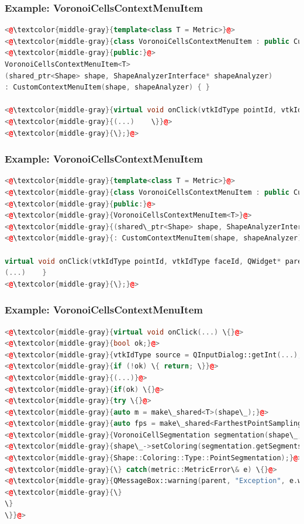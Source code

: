 \documentclass[compress]{beamer}
\begin{document}
\begin{frame}[fragile]
\frametitle{Example: VoronoiCellsContextMenuItem}

\begin{lstlisting}[language=C++, numbers=none]
<@\textcolor{middle-gray}{template<class T = Metric>}@>
<@\textcolor{middle-gray}{class VoronoiCellsContextMenuItem : public CustomContextMenuItem \{}@>
<@\textcolor{middle-gray}{public:}@>
VoronoiCellsContextMenuItem<T>
(shared_ptr<Shape> shape, ShapeAnalyzerInterface* shapeAnalyzer)
: CustomContextMenuItem(shape, shapeAnalyzer) { }

<@\textcolor{middle-gray}{virtual void onClick(vtkIdType pointId, vtkIdType faceId, QWidget* parent) \{}@>
<@\textcolor{middle-gray}{(...)    \}}@>
<@\textcolor{middle-gray}{\};}@>
\end{lstlisting}

\end{frame}

\begin{frame}[fragile]
\frametitle{Example: VoronoiCellsContextMenuItem}

\begin{lstlisting}[language=C++, numbers=none]
<@\textcolor{middle-gray}{template<class T = Metric>}@>
<@\textcolor{middle-gray}{class VoronoiCellsContextMenuItem : public CustomContextMenuItem \{}@>
<@\textcolor{middle-gray}{public:}@>
<@\textcolor{middle-gray}{VoronoiCellsContextMenuItem<T>}@>
<@\textcolor{middle-gray}{(shared\_ptr<Shape> shape, ShapeAnalyzerInterface* shapeAnalyzer)}@>
<@\textcolor{middle-gray}{: CustomContextMenuItem(shape, shapeAnalyzer) \{ \}}@>

virtual void onClick(vtkIdType pointId, vtkIdType faceId, QWidget* parent) {
(...)    }
<@\textcolor{middle-gray}{\};}@>
\end{lstlisting}

\end{frame}

\begin{frame}[fragile]
\frametitle{Example: VoronoiCellsContextMenuItem}

\begin{lstlisting}[language=C++, numbers=none]
<@\textcolor{middle-gray}{virtual void onClick(...) \{}@>
<@\textcolor{middle-gray}{bool ok;}@>
<@\textcolor{middle-gray}{vtkIdType source = QInputDialog::getInt(...);}@>
<@\textcolor{middle-gray}{if (!ok) \{ return; \}}@>
<@\textcolor{middle-gray}{(...)}@>
<@\textcolor{middle-gray}{if(ok) \{}@>
<@\textcolor{middle-gray}{try \{}@>
<@\textcolor{middle-gray}{auto m = make\_shared<T>(shape\_);}@>
<@\textcolor{middle-gray}{auto fps = make\_shared<FarthestPointSampling>(shape\_, m, source, numberOfSegments);}@>
<@\textcolor{middle-gray}{VoronoiCellSegmentation segmentation(shape\_, m, fps);}@>
<@\textcolor{middle-gray}{shape\_->setColoring(segmentation.getSegments(), }@>
<@\textcolor{middle-gray}{Shape::Coloring::Type::PointSegmentation);}@>
<@\textcolor{middle-gray}{\} catch(metric::MetricError\& e) \{}@>
<@\textcolor{middle-gray}{QMessageBox::warning(parent, "Exception", e.what());}@>
<@\textcolor{middle-gray}{\}
\}
\}}@>
\end{lstlisting}

\end{frame}
\end{document}
